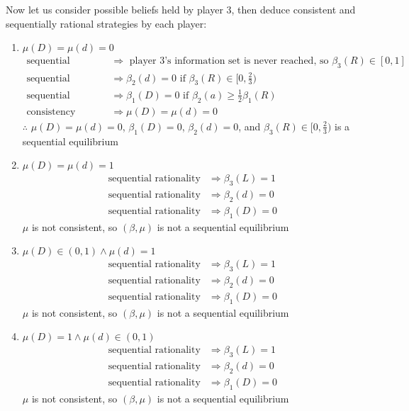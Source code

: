 \documentclass{article}
\begin{document}
Now let us consider possible beliefs held by player 3, then deduce consistent and sequentially rational strategies by each player:
\begin{enumerate}
	\item $\mu(D) = \mu(d) = 0$
		\begin{align*}
			\text{sequential rationality} 	&\Rightarrow \text{ player 3's information set is never reached, so }\beta_3(R)\in[0,1] \\
			\text{sequential rationality} 	&\Rightarrow \beta_2(d) = 0	\text{ if }\beta_3(R)\in[0,\frac{2}{3})\\
			\text{sequential rationality} 	&\Rightarrow \beta_1(D) = 0 \text{ if }\beta_2(a)\geq\frac{1}{2}\beta_1(R)	\\
			\text{consistency}				&\Rightarrow \mu(D) = \mu(d) = 0	
		\end{align*}
		$\therefore$ ${\mu(D) = \mu(d) = 0}$, ${\beta_1(D)=0}$, ${\beta_2(d)=0}$, and ${\beta_3(R)\in[0,\frac{2}{3})}$ is a sequential equilibrium 
		
	\item $\mu(D) = \mu(d) = 1$
		\begin{align*}
			\text{sequential rationality} 	&\Rightarrow \beta_3(L) = 1	\\
			\text{sequential rationality} 	&\Rightarrow \beta_2(d) = 0	\\
			\text{sequential rationality} 	&\Rightarrow \beta_1(D) = 0	
		\end{align*}
		$\mu$ is not consistent, so $(\beta,\mu)$ is not a sequential equilibrium
		
	\item $\mu(D)\in(0,1)\land \mu(d) = 1$
		\begin{align*}
			\text{sequential rationality} 	&\Rightarrow \beta_3(L) = 1	\\
			\text{sequential rationality} 	&\Rightarrow \beta_2(d) = 0	\\
			\text{sequential rationality} 	&\Rightarrow \beta_1(D) = 0	
		\end{align*}
		$\mu$ is not consistent, so $(\beta,\mu)$ is not a sequential equilibrium
		
	\item $\mu(D) = 1\land \mu(d)\in(0,1)$
		\begin{align*}
			\text{sequential rationality} 	&\Rightarrow \beta_3(L) = 1	\\
			\text{sequential rationality} 	&\Rightarrow \beta_2(d) = 0	\\
			\text{sequential rationality} 	&\Rightarrow \beta_1(D) = 0	
		\end{align*}
		$\mu$ is not consistent, so $(\beta,\mu)$ is not a sequential equilibrium
		

\end{enumerate}
\end{document}
